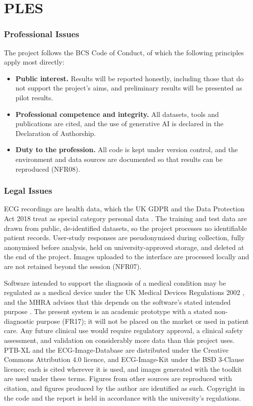 \documentclass[12pt,nonacm,acmlarge,titlepage,screen]{acmart}
\begin{document}
\endgroup

\section{PLES}
\label{app:ples}
\subsubsection{Professional Issues}
The project follows the BCS Code of Conduct, of which the following principles apply most directly:
\begin{itemize}\setlength{\itemsep}{0pt}\setlength{\parskip}{0pt}
  \item \textbf{Public interest.} Results will be reported honestly, including those that do not support the project's aims, and preliminary results will be presented as pilot results.
  \item \textbf{Professional competence and integrity.} All datasets, tools and publications are cited, and the use of generative AI is declared in the Declaration of Authorship. %
  \item \textbf{Duty to the profession.} All code is kept under version control, and the environment and data sources are documented so that results can be reproduced (NFR08).
\end{itemize}

\subsubsection{Legal Issues}
ECG recordings are health data, which the UK GDPR and the Data Protection Act 2018 treat as special category personal data \cite{dpa_2018}. The training and test data are drawn from public, de-identified datasets, so the project processes no identifiable patient records. User-study responses are pseudonymised during collection, fully anonymised before analysis, held on university-approved storage, and deleted at the end of the project. Images uploaded to the interface are processed locally and are not retained beyond the session (NFR07).

Software intended to support the diagnosis of a medical condition may be regulated as a medical device under the UK Medical Devices Regulations 2002 \cite{uk_mdr_2002}, and the MHRA advises that this depends on the software's stated intended purpose \cite{mhra_samd_2025}. The present system is an academic prototype with a stated non-diagnostic purpose (FR17); it will not be placed on the market or used in patient care. Any future clinical use would require regulatory approval, a clinical safety assessment, and validation on considerably more data than this project uses.
PTB-XL and the ECG-Image-Database are distributed under the Creative Commons Attribution 4.0 licence, and ECG-Image-Kit under the BSD 3-Clause licence; each is cited wherever it is used, and images generated with the toolkit are used under these terms. Figures from other sources are reproduced with citation, and figures produced by the author are identified as such. Copyright in the code and the report is held in accordance with the university's regulations.
\end{document}
